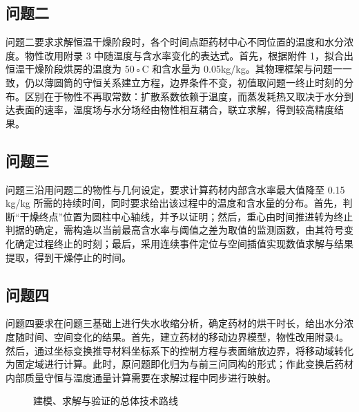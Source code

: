 \subsection*{问题二}
问题二要求求解恒温干燥阶段时，各个时间点距药材中心不同位置的温度和水分浓度。物性改用附录 3 中随温度与含水率变化的表达式。首先，根据附件 1，拟合出恒温干燥阶段烘房的温度为 50◦C 和含水量为 0.05kg/kg。其物理框架与问题一一致，仍以薄圆筒的守恒关系建立方程，边界条件不变，初值取问题一终止时刻的分布。区别在于物性不再取常数：扩散系数依赖于温度，而蒸发耗热又取决于水分到达表面的速率，温度场与水分场经由物性相互耦合，联立求解，得到较高精度结果。

\subsection*{问题三}
问题三沿用问题二的物性与几何设定，要求计算药材内部含水率最大值降至 0.15 kg/kg 所需的持续时间，同时要求给出该过程中的温度和含水量的分布。首先，判断“干燥终点”位置为圆柱中心轴线，并予以证明；然后，重心由时间推进转为终止判据的确定，需构造以当前最高含水率与阈值之差为取值的监测函数，由其符号变化确定过程终止的时刻；最后，采用连续事件定位与空间插值实现数值求解与结果提取，得到干燥停止的时间。

\subsection*{问题四}
问题四要求在问题三基础上进行失水收缩分析，确定药材的烘干时长，给出水分浓度随时间、空间变化的结果。首先，建立药材的移动边界模型，物性改用附录4。然后，通过坐标变换推导材料坐标系下的控制方程与表面缩放边界，将移动域转化为固定域进行计算。此时，原问题即化归为与前三问同构的形式；作此变换后药材内部质量守恒与温度通量计算需要在求解过程中同步进行映射。

\begin{figure}[H]\centering
{}
\caption{建模、求解与验证的总体技术路线}\label{fig:roadmap}
\end{figure}

